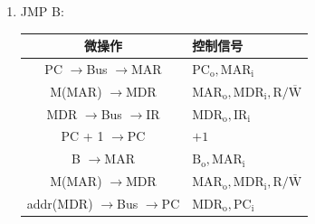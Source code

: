 \documentclass[UTF8]{report}
\newenvironment{solution}{{\noindent\hskip 2em \bf 解 \quad}}{}
\renewcommand{\to}{$\rightarrow$}
\begin{document}
\newpage

\begin{solution}
    \begin{enumerate}[label=(\arabic*)]
        \item JMP \@ B:
        \begin{table}[htbp]
            \centering
            \begin{tabular}{cl}
                \toprule
                微操作 & 控制信号 \\
                \midrule
                PC \to Bus \to MAR        & $\mathrm{PC_o, MAR_i                   }$\\
                M(MAR) \to MDR            & $\mathrm{MAR_o, MDR_i, R/\overline{W}  }$\\
                MDR \to Bus \to IR        & $\mathrm{MDR_o, IR_i                   }$\\
                PC + 1 \to PC             & $\mathrm{+1                            }$\\
                \midrule
                B \to MAR                 & $\mathrm{B_o, MAR_i                    }$\\
                M(MAR) \to MDR            & $\mathrm{MAR_o, MDR_i, R/\overline{W}  }$\\
                addr(MDR) \to Bus \to PC  & $\mathrm{MDR_o, PC_i                   }$\\
                \bottomrule
            \end{tabular}
        \end{table}

        \newpage


\end{enumerate}
\end{solution}
\end{document}
